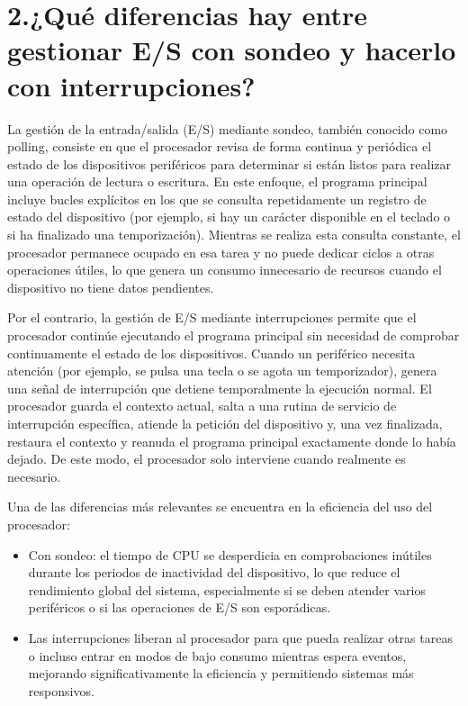 \documentclass[12pt, letterpaper]{article}
\begin{document}
\newpage

\section*{\textbf{2.¿Qué diferencias hay entre gestionar E/S con sondeo y hacerlo con interrupciones?}}

La gestión de la entrada/salida (E/S) mediante sondeo, también conocido como polling, consiste en que el procesador revisa de forma continua y periódica el estado de los dispositivos periféricos para determinar si están listos para realizar una operación de lectura o escritura. 
En este enfoque, el programa principal incluye bucles explícitos en los que se consulta repetidamente un registro de estado del dispositivo (por ejemplo, si hay un carácter disponible en el teclado o si ha finalizado una temporización). Mientras se realiza esta consulta constante, el procesador permanece ocupado en esa tarea y no puede dedicar ciclos a otras operaciones útiles, lo que genera un consumo innecesario de recursos cuando el dispositivo no tiene datos pendientes.

Por el contrario, la gestión de E/S mediante interrupciones permite que el procesador continúe ejecutando el programa principal sin necesidad de comprobar continuamente el estado de los dispositivos. Cuando un periférico necesita atención (por ejemplo, se pulsa una tecla o se agota un temporizador), genera una señal de interrupción que detiene temporalmente la ejecución normal. 
El procesador guarda el contexto actual, salta a una rutina de servicio de interrupción específica, atiende la petición del dispositivo y, una vez finalizada, restaura el contexto y reanuda el programa principal exactamente donde lo había dejado. De este modo, el procesador solo interviene cuando realmente es necesario.

Una de las diferencias más relevantes se encuentra en la eficiencia del uso del procesador:
\begin{itemize}
    \item Con sondeo: el tiempo de CPU se desperdicia en comprobaciones inútiles durante los periodos de inactividad del dispositivo, lo que reduce el rendimiento global del sistema, especialmente si se deben atender varios periféricos o si las operaciones de E/S son esporádicas.
    \item Las interrupciones liberan al procesador para que pueda realizar otras tareas o incluso entrar en modos de bajo consumo mientras espera eventos, mejorando significativamente la eficiencia y permitiendo sistemas más responsivos.
\end{itemize}
\end{document}
